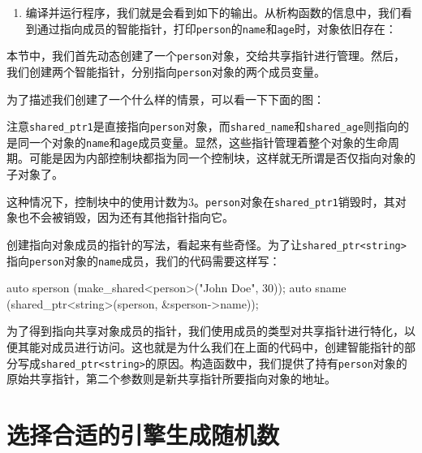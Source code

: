 \begin{enumerate}
\begin{codebox}[cpp]
    cout << "name: " << *shared_name
        << "\nage: " << *shared_age << '\n';
}   
\end{codebox}

\item 编译并运行程序，我们就是会看到如下的输出。从析构函数的信息中，我们看到通过指向成员的智能指针，打印\texttt{person}的\texttt{name}和\texttt{age}时，对象依旧存在：


\end{enumerate}


本节中，我们首先动态创建了一个\texttt{person}对象，交给共享指针进行管理。然后，我们创建两个智能指针，分别指向\texttt{person}对象的两个成员变量。

为了描述我们创建了一个什么样的情景，可以看一下下面的图：


注意\texttt{shared\_ptr1}是直接指向\texttt{person}对象，而\texttt{shared\_name}和\texttt{shared\_age}则指向的是同一个对象的\texttt{name}和\texttt{age}成员变量。显然，这些指针管理着整个对象的生命周期。可能是因为内部控制块都指为同一个控制块，这样就无所谓是否仅指向对象的子对象了。

这种情况下，控制块中的使用计数为3。\texttt{person}对象在\texttt{shared\_ptr1}销毁时，其对象也不会被销毁，因为还有其他指针指向它。

创建指向对象成员的指针的写法，看起来有些奇怪。为了让\texttt{shared\_ptr<string>}指向\texttt{person}对象的\texttt{name}成员，我们的代码需要这样写：

\begin{codebox}[cpp]
auto sperson (make_shared<person>("John Doe", 30));
auto sname (shared_ptr<string>(sperson, &sperson->name));
\end{codebox}

为了得到指向共享对象成员的指针，我们使用成员的类型对共享指针进行特化，以便其能对成员进行访问。这也就是为什么我们在上面的代码中，创建智能指针的部分写成\texttt{shared\_ptr<string>}的原因。构造函数中，我们提供了持有\texttt{person}对象的原始共享指针，第二个参数则是新共享指针所要指向对象的地址。


\section{选择合适的引擎生成随机数}

